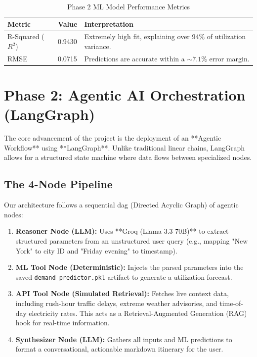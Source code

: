 \documentclass{article}
\begin{document}
\begin{table}[h]
    \centering
    \begin{tabular}{@{}llp{8cm}@{}}
        \toprule
        \textbf{Metric} & \textbf{Value} & \textbf{Interpretation} \\
        \midrule
        R-Squared ($R^2$) & 0.9430 & Extremely high fit, explaining over 94\% of utilization variance. \\
        RMSE & 0.0715 & Predictions are accurate within a $\sim 7.1\%$ error margin. \\
        \bottomrule
    \end{tabular}
    \caption{Phase 2 ML Model Performance Metrics}
    \label{tab:metrics}
\end{table}

\section{Phase 2: Agentic AI Orchestration (LangGraph)}
The core advancement of the project is the deployment of an **Agentic Workflow** using **LangGraph**. Unlike traditional linear chains, LangGraph allows for a structured state machine where data flows between specialized nodes.

\subsection{The 4-Node Pipeline}
Our architecture follows a sequential dag (Directed Acyclic Graph) of agentic nodes:

\begin{enumerate}
    \item \textbf{Reasoner Node (LLM):} Uses **Groq (Llama 3.3 70B)** to extract structured parameters from an unstructured user query (e.g., mapping "New York" to city ID and "Friday evening" to timestamp).
    \item \textbf{ML Tool Node (Deterministic):} Injects the parsed parameters into the saved \texttt{demand\_predictor.pkl} artifact to generate a utilization forecast.
    \item \textbf{API Tool Node (Simulated Retrieval):} Fetches live context data, including rush-hour traffic delays, extreme weather advisories, and time-of-day electricity rates. This acts as a Retrieval-Augmented Generation (RAG) hook for real-time information.
    \item \textbf{Synthesizer Node (LLM):} Gathers all inputs and ML predictions to format a conversational, actionable markdown itinerary for the user.
\end{enumerate}
\end{document}
